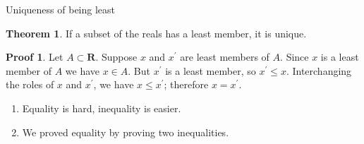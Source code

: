 \documentclass[fleqn]{beamer}
\newcommand{\reals}{\mathbf{R}}
\theoremstyle{definition}
\newtheorem{myth}{Theorem}
\newtheorem{myproof}{Proof}
\newenvironment{numberlist}
   {\begin{enumerate}[(1)]
       \addtolength{\itemsep}{-0.5\itemsep}}
     {\end{enumerate}}
\begin{document}
\begin{frame}{Uniqueness of being least}

\begin{myth} If a subset of the reals has a least member, it is unique.

\end{myth}

\begin{myproof} Let \(A \subset \reals\). Suppose \(x\) and  \(x^\prime\) are least members of \(A\). Since \(x\) is a least member of \(A\) we have
  \(x \in A\). But \(x^\prime\) is a least member, so \(x^\prime \leq x\).
Interchanging the roles of \(x\) and \(x^\prime\), we have
\(x \leq x^\prime\); therefore \(x = x^\prime\).

\end{myproof}

\begin{numberlist}
\item Equality is hard, inequality is easier.
\item We proved equality by proving two inequalities.
\end{numberlist}
\end{frame}
\end{document}
